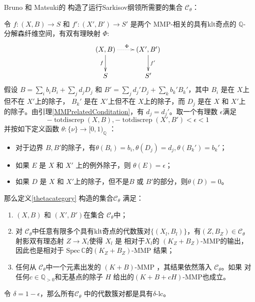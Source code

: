  Bruno 和 Matsuki的\cite[Lemma 3.6]{brunoLogSarkisovProgram1995} 构造了运行Sarkisov纲领所需要的集合 $\mathcal{C}_{\theta} $：
\begin{proposition}\label{cat}
  令 $ f:(X,B)\to S$ 和 $f':(X',B')\to S' $ 是两个 MMP-相关的具有klt奇点的 $ \mathbb{Q} $-分解森纤维空间，有双有理映射 $\Phi$:
  \[ \xymatrix{
      {(X,B)}\ar[d]_{f}\ar@{.>}[r]^\Phi&(X',B')\ar[d]^{f'}\\
      S&S'} \]
假设 $ B=\sum_{i}b_{i}B_{i}+\sum_{j}d_{j}D_j $ 和 $ B'=\sum_jd_j'D_j+\sum_kb_k'B_k' $，其中 $ B_{i} $ 是在 $ X $上但不在 $ X' $上的除子， $ B_k' $ 是在 $ X' $上但不在  $ X $上的除子，而 $ D_j $ 是在 $ X $ 和 $ X' $上的除子。由引理\ref{MMPrelatedConditation}，有 $ d_j=d_j' $。取一个有理数 $\epsilon$满足 
\[
  -\operatorname{totdiscrep}(X,B),-\operatorname{totdiscrep}(X',B')  <\epsilon <1 
\]
并按如下定义函数 $ \theta: \{ \nu \} \to [0,1)_\mathbb{Q} $ ：
  \begin{itemize}
    \item 对于边界  $B,B'$的除子，有$ \theta(B_i)=b_i, \theta(D_j)=d_j,\theta(B_k')=b_k'$；
    \item  如果 $E$ 是 $X$ 和 $X'$ 上的例外除子，则    $ \theta(E)=\epsilon $；
    \item   如果 $ D $ 是 $ X $ 和 $ X' $上的除子，但不是$ B $ 或 $ B' $的部分，则$ \theta(D)=0 $。
  \end{itemize}
  那么定义\ref{thetacategory} 构造的集合$ \mathcal{C}_\theta $ 满足：
  \begin{enumerate}
    \item $ (X,B) $ 和 $ (X',B') $在集合 $ \mathcal{C}_\theta $中；
    \item   对 $ \mathcal{C}_\theta $中任意有限多个具有klt奇点的代数簇对$ \{(X_l,B_l)\} $，有$ (Z,B_Z)\in \mathcal{C}_\theta $ 射影双有理态射 $ Z\to X_l $使得 $X_{l}$ 是 相对于$X_{l}$的   $ (K_{Z}+B_{Z}) $-MMP的输出，因此也是相对于 $ \mathrm{Spec}\,\mathbb{C} $的$(K_Z+B_Z)$-MMP 结果；
    \item 任何从  $ \mathcal{C}_\theta $中一个元素出发的 $ (K+B) $-MMP ，其结果依然落入 $ \mathcal{C}_\theta $。如果 对任何$ c\in \mathbb{Q}_{>0} $和无基点的除子 $H$ 给出的$ (K+B+cH) $-MMP也成立。
  \end{enumerate}
\end{proposition}
\begin{remark}\label{delta-lc}
  令 $\delta=1-\epsilon$，那么所有$\mathcal{C}_{\theta}$ 中的代数簇对都是具有$\delta$-lc。
\end{remark}

